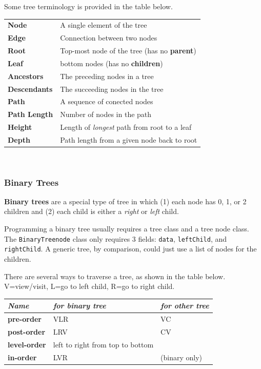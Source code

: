 Some tree terminology is provided in the table below. \\

\begin{tabular}{p{}p{}}
\textbf{Node} & A single element of the tree \\
\textbf{Edge} & Connection between two nodes \\
\textbf{Root} & Top-most node of the tree (has no \textbf{parent}) \\
\textbf{Leaf} & bottom nodes (has no \textbf{children}) \\
\textbf{Ancestors} & The preceding nodes in a tree \\
\textbf{Descendants} & The succeeding nodes in the tree \\
\textbf{Path} & A sequence of conected nodes \\
\textbf{Path Length} & Number of nodes in the path \\
\textbf{Height} & Length of \textit{longest} path from root to a leaf \\
\textbf{Depth} & Path length from a given node back to root \\
\end{tabular} \\

\subsubsection{Binary Trees}

\textbf{Binary trees} are a special type of tree in which (1) each node has 0, 1, or 2 children and (2) each child is either a \textit{right} or \textit{left} child. 

Programming a binary tree usually requires a tree class and a tree node class. The \texttt{BinaryTreenode} class only requires 3 fields: \texttt{data}, \texttt{leftChild}, and \texttt{rightChild}. A generic tree, by comparison, could just use a list of nodes for the children. 

There are several ways to traverse a tree, as shown in the table below. V=view/visit, L=go to left child, R=go to right child. \\

\begin{tabular}{p{}p{}p{}}
\textit{Name} & \textit{for binary tree} & \textit{for other tree} \\
\hline
\textbf{pre-order} & VLR & VC \\
\textbf{post-order} & LRV & CV \\
\textbf{level-order} & left to right from top to bottom \\
\textbf{in-order} & LVR & (binary only) \\
\end{tabular} \\

